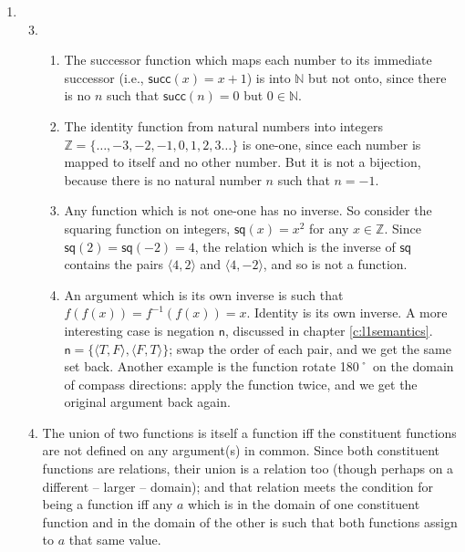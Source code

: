 {\begin{enumerate}
\begin{enumerate}
		For example, let $X = \{1,2\}, Y=\{2,3\}$. $\{1,3\}\in \wp(X\cup Y)$, but $\{1,3\}\notin \wp(X)\cup \wp(Y)$; by extensionality, $\wp(X) \cup \wp(Y) \neq \wp(X \cup Y)$. 
	\end{enumerate}\setcounter{enumi}{16}
	\item \begin{enumerate}
		\setcounter{enumii}{2}
		\item \begin{enumerate} 
			\item The successor function which maps each number to its immediate successor (i.e., $\mathsf{succ}(x) = x+1$) is into $\mathbb{N}$ but not onto, since there is no $n$ such that $\mathsf{succ}(n) = 0$ but $0 \in \mathbb{N}$.
			\item The identity function from natural numbers into integers $\mathbb{Z} = \{…,-3,-2,-1,0,1,2,3…\}$ is one-one, since each number is mapped to itself and no other number. But it is not a bijection, because there is no natural number $n$ such that $n = -1$.
			\item Any function which is not one-one has no inverse. So consider the squaring function on integers, $\mathsf{sq}(x) = x^{2}$ for any $x\in\mathbb{Z}$. Since $\mathsf{sq}(2)=\mathsf{sq}(-2)=4$, the relation which is the inverse of $\mathsf{sq}$ contains the pairs $\langle 4,2\rangle$ and $\langle 4,-2\rangle$, and so is not a function.
			\item An argument which is its own inverse is such that $f(f(x)) = f^{-1}(f(x)) = x$. Identity is its own inverse. A more interesting case is negation $\mathsf{n}$, discussed in chapter \autoref{c:l1semantics}. $\mathsf{n}=\{\langle T,F\rangle,\langle F,T\rangle\}$; swap the order of each pair, and we get the same set back. Another example is the function \textsf{rotate 180˚} on the domain of compass directions: apply the function twice, and we get the original argument back again. 
		\end{enumerate}
		\item The union of two functions is itself a function iff the constituent functions are not defined on any argument(s) in common. Since both constituent functions are relations, their union is a relation too (though perhaps on a different – larger – domain); and that relation meets the condition for being a function iff any $a$ which is in the domain of one constituent function and in the domain of the other is such that both functions assign to $a$ that same value.   
	\end{enumerate}
\end{enumerate}

}
